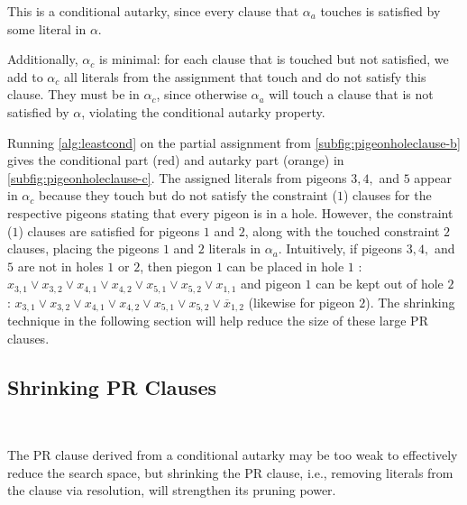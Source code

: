 This is a conditional autarky, since every clause that $\alpha_a$ touches is
satisfied by some literal in $\alpha$.

Additionally, $\alpha_c$ is minimal: for each clause that is touched but not
satisfied, we add to $\alpha_c$ all literals from the assignment that touch and do
not satisfy this clause. They must be in $\alpha_c$, since otherwise $\alpha_a$
will touch a clause that is not satisfied by $\alpha$, violating the conditional
autarky property.

Running \autoref{alg:leastcond} on the partial assignment from \autoref{subfig:pigeonholeclause-b}  
gives the conditional part (red) and autarky part (orange) in \autoref{subfig:pigeonholeclause-c}. 
The assigned literals from pigeons $3,4,$ and $5$ appear in $\alpha_c$ because they touch 
but do not satisfy the constraint ($1$) clauses for the respective pigeons stating that every pigeon is in a hole. 
However, the constraint ($1$) clauses are satisfied for pigeons $1$ and $2$, 
along with the touched constraint $2$ clauses, placing the pigeons $1$ and $2$ literals in $\alpha_a$. 
Intuitively, if pigeons $3,4,$ and $5$ are not in holes $1$ or $2$, then piegon $1$ can be placed in hole $1$ : 
$x_{3,1} \lor x_{3,2} \lor x_{4,1} \lor x_{4,2} \lor x_{5,1} \lor x_{5,2} \lor x_{1,1} $ and pigeon $1$ can be kept out of hole $2$ :
$x_{3,1} \lor x_{3,2} \lor x_{4,1} \lor x_{4,2} \lor x_{5,1} \lor x_{5,2} \lor \overline{x}_{1,2} $ (likewise for pigeon $2$). 
The shrinking technique in the following section will help reduce the size of these large PR clauses. 



\subsection{Shrinking PR Clauses}~\label{subsec:shrinking}

The PR clause derived from a conditional autarky may be too weak to effectively reduce the search space, 
but shrinking the PR clause, i.e., removing literals from the clause via resolution, will strengthen its pruning power. 

